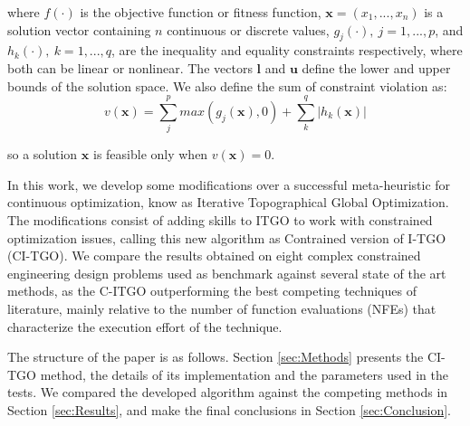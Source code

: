 \noindent
where $f(\cdot)$ is the objective function or fitness function, $\bm{x} = (x_1, ..., x_n)$ is a solution vector containing $n$ continuous or discrete values, $g_j(\cdot), \ j = 1, ..., p$, and $h_k(\cdot), \ k = 1, ..., q$, are the inequality and equality constraints respectively, where both can be linear or nonlinear. The vectors $\bm{l}$ and $\bm{u}$ define the lower and upper bounds of the solution space. We also define the sum of constraint violation as: \\[-3em]

\begin{equation}\label{eq:viol}
    v(\bm{x}) = \sum_j^p max(g_j(\bm{x}), 0) + \sum_k^q |h_k(\bm{x})|
\end{equation}

\noindent
so a solution $\bm{x}$ is feasible only when $v(\bm{x}) = 0$. 

In this work, we develop some modifications over a successful meta-heuristic for continuous optimization, know as Iterative Topographical Global Optimization. The modifications consist of adding skills to ITGO to work with constrained optimization issues, calling this new algorithm as Contrained version of I-TGO (CI-TGO). We compare the results obtained on eight complex constrained engineering design problems used as benchmark against several state of the art methods, as the C-ITGO outperforming the best competing techniques of literature, mainly relative to the number of function evaluations (NFEs) that characterize the execution effort of the technique.

The structure of the paper is as follows. Section \ref{sec:Methods} presents the CI-TGO method, the details of its implementation and the parameters used in the tests. We compared the developed algorithm against the competing methods in Section \ref{sec:Results}, and make the final conclusions in Section \ref{sec:Conclusion}.